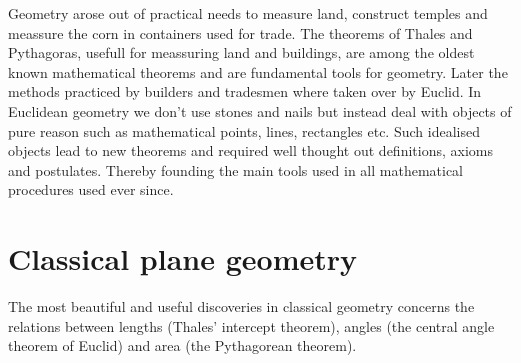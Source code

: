 
Geometry arose out of practical needs to measure land, construct temples and meassure the corn in containers used for trade. The theorems of Thales and Pythagoras, usefull for meassuring land and buildings, are among the oldest known mathematical theorems and are fundamental tools for geometry. Later the methods practiced by builders and tradesmen where taken over by Euclid. In Euclidean geometry we don't use stones and nails but instead deal with objects of pure reason such as mathematical points, lines, rectangles etc. Such idealised objects lead to new theorems and required well thought out definitions, axioms and postulates. Thereby founding the main tools used in all mathematical procedures used ever since.

\section{Classical plane geometry}
The most beautiful and useful discoveries in classical geometry concerns the relations between lengths (Thales’ intercept theorem), angles (the central angle theorem of Euclid) and area (the Pythagorean theorem).

